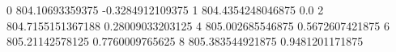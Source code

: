 0 804.10693359375 -0.3284912109375
1 804.4354248046875 0.0
2 804.7155151367188 0.28009033203125
4 805.002685546875 0.5672607421875
6 805.21142578125 0.7760009765625
8 805.383544921875 0.9481201171875
